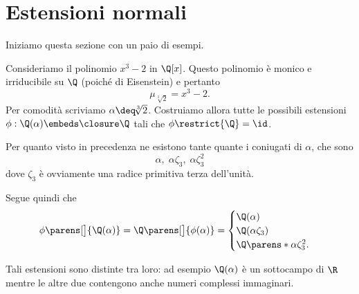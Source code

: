 \section{Estensioni normali}

Iniziamo questa sezione con un paio di esempi.

\begin{example}
    Consideriamo il polinomio $x^3 - 2$ in $\Q[x]$. Questo polinomio è monico e irriducibile su $\Q$ (poiché di Eisenstein) e pertanto \[
        \mu_{\!\!\sqrt[3]{2}} = x^3 - 2.
    \] Per comodità scriviamo $\alpha \deq \!\sqrt[3]{2}$. Costruiamo allora tutte le possibili estensioni $\phi : \Q(\alpha) \embeds \closure\Q$ tali che $\phi\restrict{\Q} = \id$.
    
    Per quanto visto in precedenza ne esistono tante quante i coniugati di $\alpha$, che sono \[
        \alpha,\; \alpha\zeta_3,\; \alpha\zeta_3^2
    \] dove $\zeta_3$ è ovviamente una radice primitiva terza dell'unità.

    Segue quindi che \[
        \phi\parens[\big]{\Q(\alpha)} = \Q\parens[\big]{\phi(\alpha)} = \begin{cases}
            \Q(\alpha)\\
            \Q(\alpha\zeta_3)\\
            \Q\parens*{\alpha\zeta_3^2}.
        \end{cases}
    \]

    Tali estensioni sono distinte tra loro: ad esempio $\Q(\alpha)$ è un sottocampo di $\R$ mentre le altre due contengono anche numeri complessi immaginari.
\end{example}

